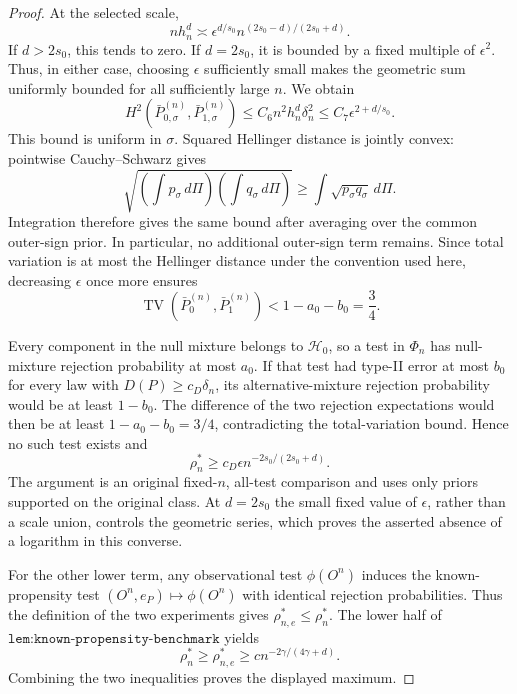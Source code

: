 \documentclass{article}
\begin{document}
\begin{proof}
At the selected scale,
\[
 nh_n^d\asymp
 \epsilon^{d/s_0}n^{(2s_0-d)/(2s_0+d)}.
\]
If \(d>2s_0\), this tends to zero.  If \(d=2s_0\), it is bounded by a fixed multiple of \(\epsilon^2\).  Thus, in either case, choosing \(\epsilon\) sufficiently small makes the geometric sum uniformly bounded for all sufficiently large \(n\).  We obtain
\[
 H^2(\bar P_{0,\sigma}^{(n)},\bar P_{1,\sigma}^{(n)})
 \leq C_6n^2h_n^d\delta_n^2
 \leq C_7\epsilon^{2+d/s_0}.
\]
This bound is uniform in \(\sigma\).  Squared Hellinger distance is jointly convex: pointwise Cauchy--Schwarz gives
\[
 \sqrt{\left(\int p_\sigma\,d\Pi\right)
              \left(\int q_\sigma\,d\Pi\right)}
 \geq\int\sqrt{p_\sigma q_\sigma}\,d\Pi.
\]
Integration therefore gives the same bound after averaging over the common outer-sign prior.  In particular, no additional outer-sign term remains.  Since total variation is at most the Hellinger distance under the convention used here, decreasing \(\epsilon\) once more ensures
\[
 \operatorname{TV}(\bar P_0^{(n)},\bar P_1^{(n)})
 <1-a_0-b_0=\frac34.
\]

Every component in the null mixture belongs to \(\mathcal H_0\), so a test in \(\Phi_n\) has null-mixture rejection probability at most \(a_0\).  If that test had type-II error at most \(b_0\) for every law with \(D(P)\geq c_D\delta_n\), its alternative-mixture rejection probability would be at least \(1-b_0\).  The difference of the two rejection expectations would then be at least \(1-a_0-b_0=3/4\), contradicting the total-variation bound.  Hence no such test exists and
\[
 \rho_n^*\geq c_D\epsilon n^{-2s_0/(2s_0+d)}.
\]
The argument is an original fixed-\(n\), all-test comparison and uses only priors supported on the original class.  At \(d=2s_0\) the small fixed value of \(\epsilon\), rather than a scale union, controls the geometric series, which proves the asserted absence of a logarithm in this converse.

For the other lower term, any observational test \(\phi(O^n)\) induces the known-propensity test \((O^n,e_P)\mapsto\phi(O^n)\) with identical rejection probabilities.  Thus the definition of the two experiments gives \(\rho_{n,e}^*\leq\rho_n^*\).  The lower half of \(\texttt{lem:known-propensity-benchmark}\) yields
\[
 \rho_n^*\geq\rho_{n,e}^*\geq c n^{-2\gamma/(4\gamma+d)}.
\]
Combining the two inequalities proves the displayed maximum.


\end{proof}
\end{document}
